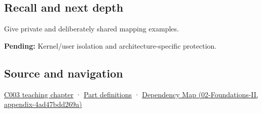 \subsection{Recall and next depth}\label{recall-and-next-depth}

Give private and deliberately shared mapping examples.

\textbf{Pending:} Kernel/user isolation and architecture-specific protection.

\subsection{Source and navigation}\label{source-and-navigation}

\href{Continuous\%20Notes/Computing\%20Foundations\%20-\%20From\%20Bits\%20to\%20C++\%20and\%20Systems\%20APIs\#Where\%20the\%20bytes\%20live}{C003 teaching chapter} · \hyperref[appendix-fd090d982a15]{Part definitions} · \href{}{Dependency Map (02-Foundations-II, appendix-4ad47bdd269a)}
